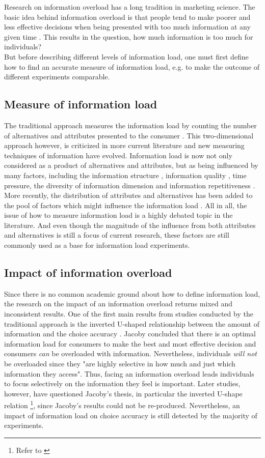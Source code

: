 Research on information overload has a long tradition in marketing science.
The basic idea behind information overload is that people tend to make poorer and less effective decisions when being presented with too much information at any given time \citep{Siegfried1965}. 
This results in the question, how much information is too much for individuals?\\
But before describing different levels of information load, one must first define how to find an accurate measure of information load, e.g. to make the outcome of different experiments comparable.
\subsection{Measure of information load}
The traditional approach measures the information load by counting the number of alternatives and attributes presented to the consumer \citep{Chen2009}. This two-dimensional approach however, is criticized in more current literature and new measuring techniques of information have evolved. Information load is now not only considered as a product of alternatives and attributes, but as being influenced by many factors, including the information structure \citep{Lurie2004}, information quality \citep{Keller1987}, time pressure, the diversity of information dimension \citep{Payne1982} and information repetitiveness \citep{Hwang1999}.
More recently, the distribution of attributes and alternatives has been added to the pool of factors which might influence the information load \citep{Lurie2004}. 
All in all, the issue of how to measure information load is a highly debated topic in the literature. And even though the magnitude of the influence from both attributes and alternatives is still a focus of current research, these factors are still commonly used as a base for information load experiments.

\subsection{Impact of information overload}

Since there is no common academic ground about how to define information load, the research on the impact of an information overload returns mixed and inconsistent results.
One of the first main results from studies conducted by the traditional approach is the inverted U-shaped relationship between the amount of information and the choice accuracy \citep{Jacoby1974}. Jacoby concluded that there is an optimal information load for consumers to make the best and most effective decision and consumers \textit{can} be overloaded with information. Nevertheless, individuals \textit{will not} be overloaded since they "are highly selective in how much and just which information they access". Thus, facing an information overload leads individuals to focus selectively on the information they feel is important.
Later studies, however, have questioned Jacoby's thesis, in particular the inverted U-shape relation \footnote{Refer to \cite{Malhotra1982}}, since Jacoby's results could not be re-produced. Nevertheless, an impact of information load on choice accuracy is still detected by the majority of experiments.

